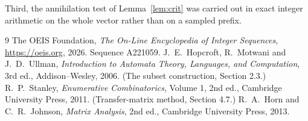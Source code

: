 \documentclass[11pt,a4paper]{article}
\theoremstyle{plain}
\theoremstyle{definition}
\begin{document}
Third, the annihilation test of Lemma~\ref{lem:crit} was carried out in exact integer
arithmetic on the whole vector rather than on a sampled prefix.

\begin{thebibliography}{9}
 The OEIS Foundation, \emph{The On-Line Encyclopedia of Integer
Sequences}, \url{https://oeis.org}, 2026. Sequence A221059.
 J.~E.~Hopcroft, R.~Motwani and J.~D.~Ullman, \emph{Introduction to Automata
Theory, Languages, and Computation}, 3rd ed., Addison--Wesley, 2006. (The subset
construction, Section 2.3.)
 R.~P.~Stanley, \emph{Enumerative Combinatorics}, Volume 1, 2nd ed.,
Cambridge University Press, 2011. (Transfer-matrix method, Section 4.7.)
 R.~A.~Horn and C.~R.~Johnson, \emph{Matrix Analysis}, 2nd ed., Cambridge
University Press, 2013.
\end{thebibliography}
\end{document}

